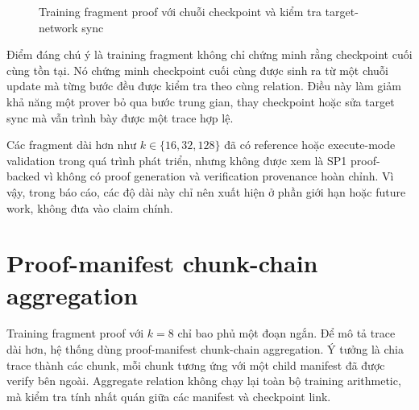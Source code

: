 \documentclass[12pt,a4paper,oneside]{report}
\begin{document}
\begin{figure}[H]
\centering
{}
\caption{Training fragment proof với chuỗi checkpoint và kiểm tra target-network sync}
\end{figure}

Điểm đáng chú ý là training fragment không chỉ chứng minh rằng checkpoint cuối cùng tồn tại. Nó chứng minh checkpoint cuối cùng được sinh ra từ một chuỗi update mà từng bước đều được kiểm tra theo cùng relation. Điều này làm giảm khả năng một prover bỏ qua bước trung gian, thay checkpoint hoặc sửa target sync mà vẫn trình bày được một trace hợp lệ.

Các fragment dài hơn như \(k \in \{16,32,128\}\) đã có reference hoặc execute-mode validation trong quá trình phát triển, nhưng không được xem là SP1 proof-backed vì không có proof generation và verification provenance hoàn chỉnh. Vì vậy, trong báo cáo, các độ dài này chỉ nên xuất hiện ở phần giới hạn hoặc future work, không đưa vào claim chính.

\section{Proof-manifest chunk-chain aggregation}

Training fragment proof với \(k=8\) chỉ bao phủ một đoạn ngắn. Để mô tả trace dài hơn, hệ thống dùng proof-manifest chunk-chain aggregation. Ý tưởng là chia trace thành các chunk, mỗi chunk tương ứng với một child manifest đã được verify bên ngoài. Aggregate relation không chạy lại toàn bộ training arithmetic, mà kiểm tra tính nhất quán giữa các manifest và checkpoint link.
\end{document}

